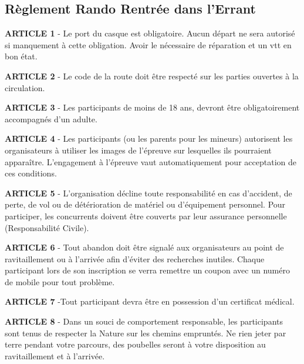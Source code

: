 \thispagestyle{empty}

\begin{center}
\section*{\sc R\`{e}glement Rando Rentr\'{e}e dans l'Errant}
\end{center}

\vspace{30pt}
\textbf{ARTICLE 1} - Le port du casque est obligatoire. Aucun d\'{e}part ne sera autoris\'{e} si manquement \`{a} cette obligation. Avoir le n\'{e}cessaire de r\'{e}paration et un vtt en bon \'{e}tat.

\vspace{10pt}
\textbf{ARTICLE 2} - Le code de la route doit \^{e}tre respect\'{e} sur les parties ouvertes \`{a} la circulation.

\vspace{10pt}
\textbf{ARTICLE 3} - Les participants de moins de 18 ans, devront \^{e}tre obligatoirement accompagn\'{e}s d'un adulte.

\vspace{10pt}
\textbf{ARTICLE 4} - Les participants (ou les parents pour les mineurs) autorisent les organisateurs \`{a} utiliser les images de l'\'{e}preuve sur lesquelles ils pourraient appara\^{i}tre. L'engagement \`{a} l'\'{e}preuve vaut automatiquement pour acceptation de ces conditions.

\vspace{10pt}
\textbf{ARTICLE 5} - L'organisation d\'{e}cline toute responsabilit\'{e} en cas d'accident, de perte, de vol ou de d\'{e}t\'{e}rioration de mat\'{e}riel ou d'\'{e}quipement personnel. Pour participer, les concurrents doivent \^{e}tre couverts par leur assurance personnelle (Responsabilit\'{e} Civile).

\vspace{10pt}
\textbf{ARTICLE 6} - Tout abandon doit \^{e}tre signal\'{e} aux organisateurs au point de ravitaillement ou \`{a} l'arriv\'{e}e afin d'\'{e}viter des recherches inutiles. Chaque participant lors de son inscription se verra remettre un coupon avec un num\'{e}ro de mobile pour tout probl\`{e}me.

\vspace{10pt}
\textbf{ARTICLE 7} -Tout participant devra \^{e}tre en possession d'un certificat m\'{e}dical.

\vspace{10pt}
\textbf{ARTICLE 8} - Dans un souci de comportement responsable, les participants sont tenus de respecter la Nature sur les chemins emprunt\'{e}s. Ne rien jeter par terre pendant votre parcours, des poubelles seront \`{a} votre disposition au ravitaillement et \`{a} l'arriv\'{e}e.

